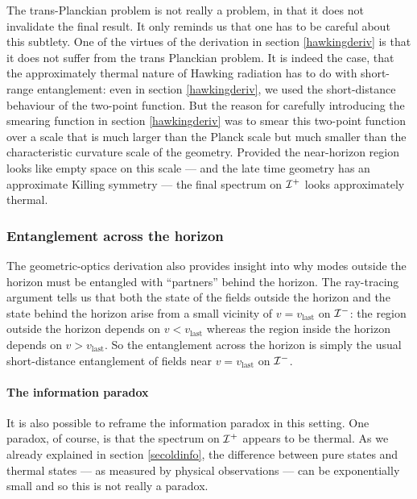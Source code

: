 \documentclass[12pt]{article}
\def \scrip{{\cal I}^{+}}
\def \scrim{{\cal I}^{-}}
\begin{document}
The trans-Planckian problem is not really a problem, in that it does not invalidate the final result. It only reminds us that one has to be careful about this subtlety. One of the virtues of the derivation in section \ref{hawkingderiv} is that it does not suffer from the trans Planckian problem. It is indeed the case, that the approximately thermal nature of Hawking radiation has to do with short-range entanglement: even in section \ref{hawkingderiv}, we used the short-distance behaviour of the two-point function. But the reason for carefully introducing the smearing function in section \ref{hawkingderiv} was to smear this two-point function over a scale that is much larger than the Planck scale but much smaller than the characteristic curvature scale of the geometry. Provided the near-horizon region looks like empty space on this scale --- and the late time geometry has an approximate Killing symmetry ---  the final spectrum on $\scrip$  looks approximately thermal.

\subsubsection*{Entanglement across the horizon }
The geometric-optics derivation also provides insight into why modes outside the horizon must be entangled with ``partners'' behind the horizon. The ray-tracing argument tells us that both the state of the fields outside the horizon and the state behind the horizon arise from a small vicinity of $v = v_{\text{last}}$ on $\scrim$:  the region outside the horizon depends on $v < v_{\text{last}}$ whereas the region inside the horizon depends on $v > v_{\text{last}}$. So the entanglement across the horizon is simply the usual short-distance entanglement of fields near $v = v_{\text{last}}$ on $\scrim$.

\paragraph{\bf The information paradox }
It is also possible to  reframe the information paradox in this setting.  One paradox, of course, is that the spectrum on $\scrip$ appears to be thermal. As we already explained in section \ref{secoldinfo}, the difference between pure states
 and thermal states --- as measured by physical observations --- can be exponentially small and so this is not really a paradox.
\end{document}
